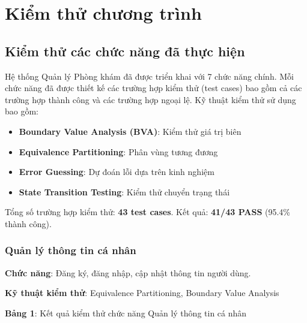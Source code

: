 \section{Kiểm thử chương trình}

\subsection{Kiểm thử các chức năng đã thực hiện}

Hệ thống Quản lý Phòng khám đã được triển khai với 7 chức năng chính. Mỗi chức năng đã được thiết kế các trường hợp kiểm thử (test cases) bao gồm cả các trường hợp thành công và các trường hợp ngoại lệ. Kỹ thuật kiểm thử sử dụng bao gồm:

\begin{itemize}
    \item \textbf{Boundary Value Analysis (BVA)}: Kiểm thử giá trị biên
    \item \textbf{Equivalence Partitioning}: Phân vùng tương đương
    \item \textbf{Error Guessing}: Dự đoán lỗi dựa trên kinh nghiệm
    \item \textbf{State Transition Testing}: Kiểm thử chuyển trạng thái
\end{itemize}

Tổng số trường hợp kiểm thử: \textbf{43 test cases}. Kết quả: \textbf{41/43 PASS} (95.4\% thành công).

\subsubsection{Quản lý thông tin cá nhân}

\textbf{Chức năng}: Đăng ký, đăng nhập, cập nhật thông tin người dùng.

\textbf{Kỹ thuật kiểm thử}: Equivalence Partitioning, Boundary Value Analysis

\textbf{Bảng 1}: Kết quả kiểm thử chức năng Quản lý thông tin cá nhân

